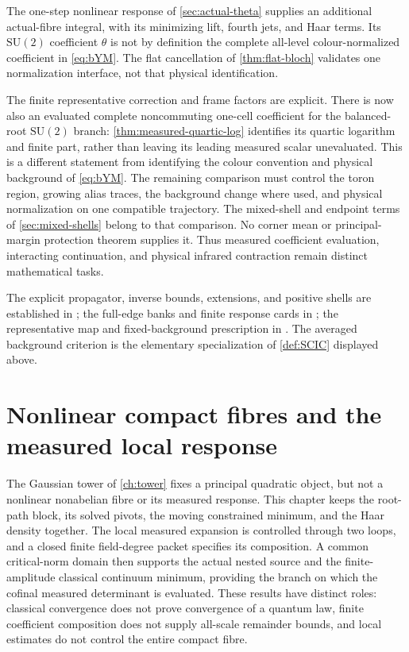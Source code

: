 \documentclass[11pt,oneside,openany]{book}
\theoremstyle{definition}
\theoremstyle{remark}
\newcommand{\SU}{\mathrm{SU}}
\newcommand{\src}[2]{\cite[#2]{#1}}
\newcommand{\sourcebasis}[1]{\par\smallskip\noindent #1\par}
\begin{document}
The one-step nonlinear response of \cref{sec:actual-theta} supplies an
additional actual-fibre integral, with its minimizing lift, fourth jets,
and Haar terms. Its $\SU(2)$ coefficient $\theta$ is not by definition
the complete all-level colour-normalized coefficient in
\cref{eq:bYM}. The flat cancellation of \cref{thm:flat-bloch} validates
one normalization interface, not that physical identification.

The finite representative correction and frame factors are explicit.
There is now also an evaluated complete noncommuting one-cell
coefficient for the balanced-root $\SU(2)$ branch:
\cref{thm:measured-quartic-log} identifies its quartic logarithm and
finite part, rather than leaving its leading measured scalar
unevaluated. This is a different statement from identifying the
colour convention and physical background of \cref{eq:bYM}.
The remaining comparison must control the toron region, growing
alias traces, the background change where used, and physical
normalization on one compatible trajectory. The mixed-shell and
endpoint terms of \cref{sec:mixed-shells} belong to that comparison.
No corner mean or principal-margin protection theorem supplies it.
Thus measured coefficient evaluation, interacting continuation, and
physical infrared contraction remain distinct mathematical tasks.
\sourcebasis{The explicit propagator, inverse bounds, extensions, and
positive shells are established in \src{F11}{V37--V38}; the full-edge
banks and finite response cards in \src{F11}{V39}; the representative map
and fixed-background prescription in \src{F11}{V41}. The averaged
background criterion is the elementary specialization of
\cref{def:SCIC} displayed above.}

\chapter{Nonlinear compact fibres and the measured local response}
\label{ch:compact-response}
The Gaussian tower of \cref{ch:tower} fixes a principal quadratic
object, but not a nonlinear nonabelian fibre or its measured response.
This chapter keeps the root-path block, its solved pivots, the moving
constrained minimum, and the Haar density together. The local measured
expansion is controlled through two loops, and a closed finite
field-degree packet specifies its composition. A common critical-norm
domain then supports the actual nested source and the finite-amplitude
classical continuum minimum, providing the branch on which the cofinal
measured determinant is evaluated. These results have distinct roles:
classical convergence does not prove convergence of a quantum law,
finite coefficient composition does not supply all-scale remainder
bounds, and local estimates do not control the entire compact fibre.
\end{document}
